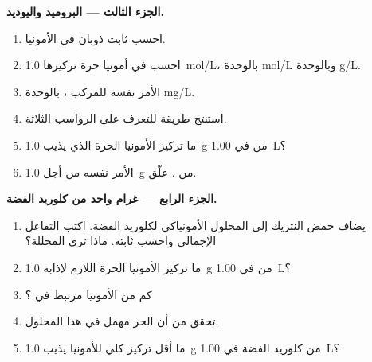 \begin{problem}
\medskip
\noindent\textbf{الجزء الثالث --- البروميد واليوديد.}
\begin{enumerate}[resume]
  \item احسب ثابت ذوبان  في الأمونيا.
  \item احسب   في أمونيا حرة تركيزها \qty{1.0}{mol/L}،
        بالوحدة \unit{mol/L} وبالوحدة \unit{g/L}.
  \item الأمر نفسه للمركب ، بالوحدة \unit{mg/L}.
  \item استنتج طريقة للتعرف على الرواسب الثلاثة.
  \item ما تركيز الأمونيا الحرة الذي يذيب \qty{1.0}{g} من
         في \qty{1.00}{L}؟
  \item الأمر نفسه من أجل \qty{1.0}{g} من . علّق.
\end{enumerate}

\medskip
\noindent\textbf{الجزء الرابع --- غرام واحد من كلوريد الفضة.}
\begin{enumerate}[resume]
  \item يضاف حمض النتريك إلى المحلول الأمونياكي لكلوريد الفضة.
        اكتب التفاعل الإجمالي واحسب ثابته. ماذا
        ترى المحللة؟
  \item ما تركيز الأمونيا الحرة اللازم لإذابة \qty{1.0}{g}
        من  في \qty{1.00}{L}؟
  \item كم من الأمونيا مرتبط في ؟
  \item تحقق من أن  الحر مهمل في هذا المحلول.
  \item ما أقل تركيز كلي للأمونيا يذيب
        \qty{1.0}{g} من كلوريد الفضة في \qty{1.00}{L}؟
\end{enumerate}
\end{problem}

